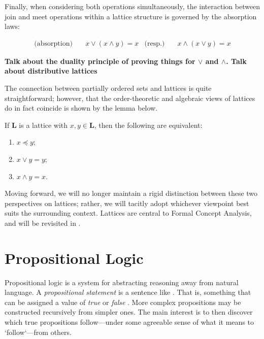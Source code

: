 Finally, when considering both operations simultaneously, the interaction between join and meet operations within a lattice structure is governed by the absorption laws:

\vspace{-1em}
\begin{align}
  \text{(absorption)} & \quad x \vee (x \wedge y) = x & \text{(resp.)}  & \quad x \wedge (x \vee y) = x
\end{align}

\textbf{Talk about the duality principle of proving things for $\vee$ and $\wedge$. Talk about distributive lattices}

The connection between partially ordered sets and lattices is quite straightforward; however, that the order-theoretic and algebraic views of lattices do in fact coincide is shown by the lemma below. 

\begin{lemma}
  \label{lemma:the-connecting-lemma}
  If $\mathbf{L}$ is a lattice with $x, y \in \mathbf{L}$, then the following are equivalent:
  \begin{enumerate}
      \setlength\itemsep{0pt}
      \setlength\parsep{0pt}
    \item $x \preceq y$;
    \item $x \vee y = y$;
    \item $x \wedge y = x$.
  \end{enumerate}
\end{lemma}

Moving forward, we will no longer maintain a rigid distinction between these two perspectives on lattices; rather, we will tacitly adopt whichever viewpoint best suits the surrounding context. Lattices are central to Formal Concept Analysis, and will be revisited in .

\section{Propositional Logic}
\label{section:propositional-logic}

Propositional logic is a system for abstracting reasoning away from natural language. A \textit{propositional statement} is a sentence like . That is, something that can be assigned a value of \textit{true} or \textit{false} \cite[p. 7]{Ben1993Mathematical}. More complex propositions may be constructed recursively from simpler ones. The main interest is to then discover which true propositions follow---under some agreeable sense of what it means to `follow`---from others.

